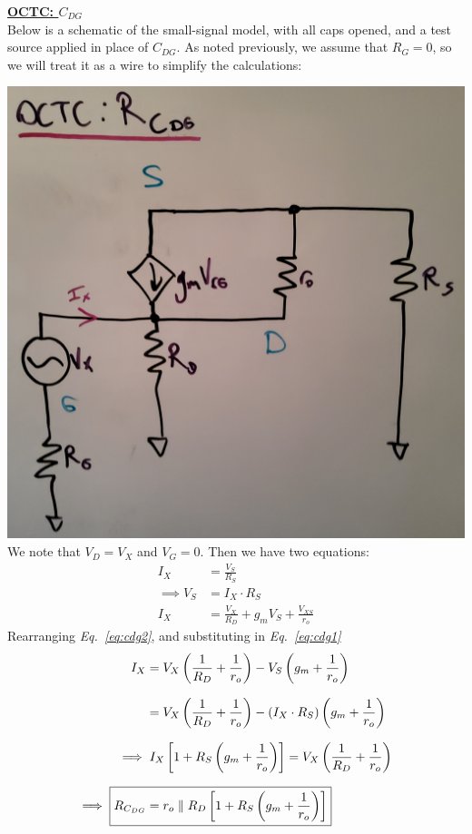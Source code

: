 \documentclass[12pt, fleqn]{article}
\begin{document}
\begin{enumerate}[label=(\alph*)]
    \newpage
    \underline{\textbf{OCTC: $C_{DG}$}}\\[0.1cm]
    Below is a schematic of the small-signal model, with all caps opened, and a test source applied in place of $C_{DG}$.  As noted previously, we assume that $R_G = 0$, so we will treat it as a wire to simplify the calculations:

    \includegraphics[scale=0.12, center]{p3c_dg.jpg}\\
    
    We note that $V_D = V_X$ and $V_G = 0$.  Then we have two equations:
    \begin{align}
        I_X &= \frac{V_S}{R_S}\\[0.25cm]
        \implies V_S  &= I_X \cdot R_S
        \label{eq:cdg1}\\[0.25cm]
        I_X &= \frac{V_X}{R_D} + g_m V_S + \frac{V_{XS}}{r_o}
        \label{eq:cdg2}
    \end{align}
\newpage
    Rearranging \textit{Eq.~\ref{eq:cdg2}}, and substituting in \textit{Eq.~\ref{eq:cdg1}}
    \begin{align*}
        I_X &= V_X \left(\frac{1}{R_D} + \frac{1}{r_o}\right) - V_S \left(g_m + \frac{1}{r_o}\right)\\[0.25cm]
        &= V_X \left(\frac{1}{R_D} + \frac{1}{r_o}\right) - (I_X \cdot R_S) \left(g_m + \frac{1}{r_o}\right)\\[0.25cm]
        \implies &\; I_X \left[1 +  R_S\left(g_m + \frac{1}{r_o}\right)\right]= V_X \left(\frac{1}{R_D} + \frac{1}{r_o}\right)\\[0.25cm]
        \implies \; \Aboxed{R_{C_{DG}} &= r_o \parallel R_D \left[1 +  R_S\left(g_m + \frac{1}{r_o}\right)\right]}
    \end{align*}


\end{enumerate}
\end{document}
